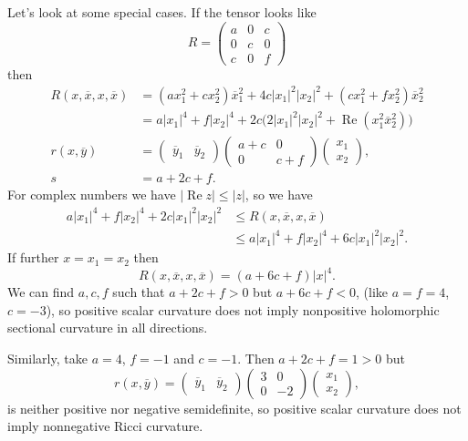 \documentclass[11pt]{article}
\theoremstyle{definition}
\def\ov#1{\overline{#1}}
\DeclareMathOperator{\re}{Re}
\begin{document}
Let's look at some special cases. If the tensor looks like
$$
R =
\begin{pmatrix}
a & 0 & c
\\
0 & c & 0
\\
c & 0 & f
\end{pmatrix}
$$
then
\begin{align*}
R(x, \ov x, x, \ov x)
&= (a x_1^2 + c x_2^2) \ov x_1^2
+ 4 c |x_1|^2 |x_2|^2
+ (c x_1^2 + f x_2^2) \ov x_2^2
\\
&= a |x_1|^4 + f |x_2|^4
+ 2 c \bigl(2 |x_1|^2 |x_2|^2 + \re(x_1^2 \ov x_2^2) \bigr)
\\
r(x, \ov y)
&=
\begin{pmatrix}\ov y_1 & \ov y_2 \end{pmatrix}
\begin{pmatrix}
a + c & 0 \\ 0 & c + f
\end{pmatrix}
\begin{pmatrix} x_1 \\ x_2 \end{pmatrix},
\\
s &= a + 2c + f.
\end{align*}
For complex numbers we have $|\re z| \leq |z|$, so we have
\begin{align*}
a |x_1|^4 + f |x_2|^4 + 2c |x_1|^2 |x_2|^2
&\leq R(x, \ov x, x, \ov x)
\\
&\leq a |x_1|^4 + f |x_2|^4 + 6c |x_1|^2 |x_2|^2.
\end{align*}
If further $x = x_1 = x_2$ then
$$
R(x, \ov x, x, \ov x)
= (a + 6c + f) |x|^4.
$$
We can find $a, c, f$ such that $a + 2c + f > 0$ but $a + 6c + f < 0$,
(like $a = f = 4$, $c = -3$), so positive scalar curvature does not imply
nonpositive holomorphic sectional curvature in all directions.

Similarly, take $a = 4$, $f = -1$ and $c = -1$. Then $a + 2c + f = 1 > 0$ but
$$
r(x, \ov y) =
\begin{pmatrix}\ov y_1 & \ov y_2 \end{pmatrix}
\begin{pmatrix}
3 & 0 \\ 0 & -2
\end{pmatrix}
\begin{pmatrix} x_1 \\ x_2 \end{pmatrix},
$$
is neither positive nor negative semidefinite, so positive scalar curvature
does not imply nonnegative Ricci curvature.
\end{document}
